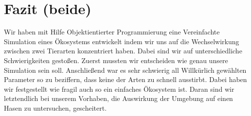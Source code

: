 \documentclass[12pt]{article}
\begin{document}
\section{Fazit (beide)}
Wir haben mit Hilfe Objektientierter Programmierung eine Vereinfachte Simulation
eines Ökosystems entwickelt indem wir uns auf die Wechselwirkung zwischen zwei Tierarten konzentriert haben.
Dabei sind wir auf unterschiedliche Schwierigkeiten gestoßen.
Zuerst mussten wir entscheiden wie genau unsere Simulation sein soll.
Anschließend war es sehr schwierig all Willkürlich gewählten Parameter so zu beziffern, dass keine der Arten zu schnell ausstirbt. Dabei haben wir festgestellt wie fragil auch so ein einfaches Ökosystem ist. Daran sind wir letztendlich bei unserem Vorhaben, die Auswirkung der Umgebung auf einen Hasen zu untersuchen, gescheitert.
\end{document}
